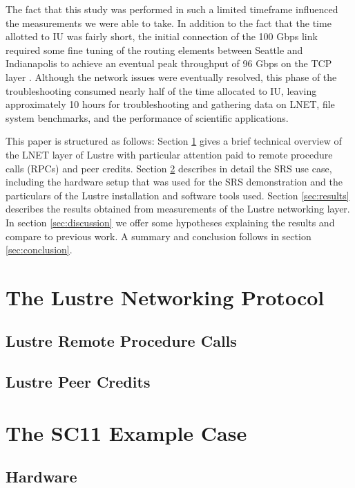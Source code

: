 \documentclass[]{sigplan-proc}
\begin{document}
The fact that this study was performed in such a limited timeframe influenced the measurements we were able to
take. In addition to the fact that the time allotted to IU was fairly short, the initial connection of the 100
Gbps link required some fine tuning of the routing elements between Seattle and Indianapolis to achieve an
eventual peak throughput of 96 Gbps on the TCP layer \cite{henschel2012}. Although the network issues were
eventually resolved, this phase of the troubleshooting consumed nearly half of the time allocated to IU,
leaving approximately 10 hours for troubleshooting and gathering data on LNET, file system benchmarks, and the
performance of  scientific applications.

This paper is structured as follows: Section \ref{sec:LNET} gives a brief technical overview of the LNET layer
of Lustre with particular attention paid to remote procedure calls (RPCs) and peer credits. Section
\ref{sec:usecase} describes in detail the SRS use case, including the hardware setup that was used for the SRS
demonstration and the particulars of the Lustre installation and software tools used. Section
\ref{sec:results} describes the results obtained from measurements of the Lustre networking layer. In section
\ref{sec:discussion} we offer some hypotheses explaining the results and compare to previous work. A summary and conclusion follows in section \ref{sec:conclusion}.

\section{The Lustre Networking Protocol}\label{sec:LNET}

\subsection{Lustre Remote Procedure Calls}

\subsection{Lustre Peer Credits}
 

\section {The SC11 Example Case}\label{sec:usecase}

\subsection{Hardware}\label{sec:hardware}
\end{document}
